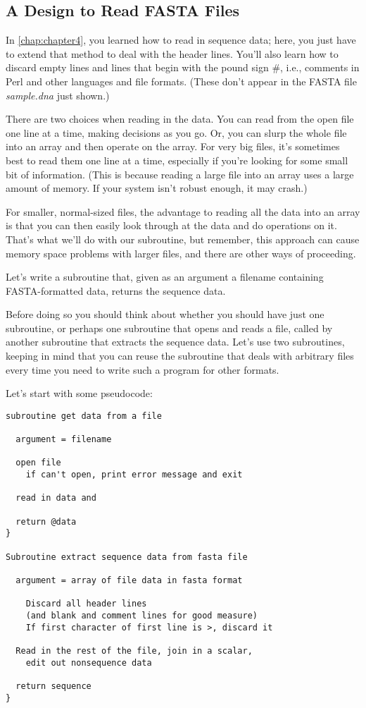 \subsection{A Design to Read FASTA Files}
In \autoref{chap:chapter4}, you learned how to read in sequence data; here, you just have to extend that method to deal with the header lines. You'll also learn how to discard empty lines and lines that begin with the pound sign \#, i.e., comments in Perl and other languages and file formats. (These don't appear in the FASTA file \textit{sample.dna} just shown.)

There are two choices when reading in the data. You can read from the open file one line at a time, making decisions as you go. Or, you can slurp the whole file into an array and then operate on the array. For very big files, it's sometimes best to read them one line at a time, especially if you're looking for some small bit of information. (This is because reading a large file into an array uses a large amount of memory. If your system isn't robust enough, it may crash.)

For smaller, normal-sized files, the advantage to reading all the data into an array is that you can then easily look through at the data and do operations on it. That's what we'll do with our subroutine, but remember, this approach can cause memory space problems with larger files, and there are other ways of proceeding.

Let's write a subroutine that, given as an argument a filename containing FASTA-formatted data, returns the sequence data.

Before doing so you should think about whether you should have just one subroutine, or perhaps one subroutine that opens and reads a file, called by another subroutine that extracts the sequence data. Let's use two subroutines, keeping in mind that you can reuse the subroutine that deals with arbitrary files every time you need to write such a program for other formats.

Let's start with some pseudocode:

\begin{lstlisting}
subroutine get data from a file

  argument = filename

  open file
    if can't open, print error message and exit

  read in data and 

  return @data
}

Subroutine extract sequence data from fasta file

  argument = array of file data in fasta format

    Discard all header lines
    (and blank and comment lines for good measure)
    If first character of first line is >, discard it

  Read in the rest of the file, join in a scalar,
    edit out nonsequence data

  return sequence
}
\end{lstlisting}

